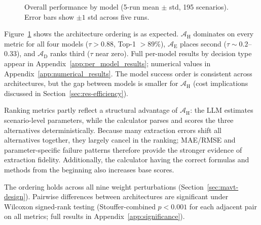\documentclass[final,3p,times]{elsarticle}
\begin{document}
\begin{figure}[htbp]
\caption{Overall performance by model (5-run mean $\pm$ std, 195 scenarios). Error bars show $\pm 1$ std across five runs.}
\label{fig:grouped_bars}
\end{figure}
\FloatBarrier

Figure~\ref{fig:grouped_bars} shows the architecture ordering is as expected. $\mathcal{A}_{\text{H}}$ dominates on every metric for all four models ($\tau > 0.88$, Top-1 $> 89\%$), $\mathcal{A}_{\text{E}}$ places second ($\tau \sim 0.2$--0.33), and $\mathcal{A}_{\text{D}}$ ranks third ($\tau$ near zero). Full per-model results by decision type appear in Appendix~\ref{app:per_model_results}; numerical values in Appendix~\ref{app:numerical_results}. The model success order is consistent across architectures, but the gap between models is smaller for $\mathcal{A}_{\text{H}}$ (cost implications discussed in Section~\ref{sec:res-efficiency}).

Ranking metrics partly reflect a structural advantage of $\mathcal{A}_{\text{H}}$: the LLM estimates scenario-level parameters, while the calculator parses and scores the three alternatives deterministically. Because many extraction errors shift all alternatives together, they largely cancel in the ranking; MAE/RMSE and parameter-specific failure patterns therefore provide the stronger evidence of extraction fidelity. Additionally, the calculator having the correct formulas and methods from the beginning also increases base scores. 

The ordering holds across all nine weight perturbations (Section~\ref{sec:mavt-design}). Pairwise differences between architectures are significant under Wilcoxon signed-rank testing (Stouffer-combined $p < 0.001$ for each adjacent pair on all metrics; full results in Appendix~\ref{app:significance}).
\end{document}
